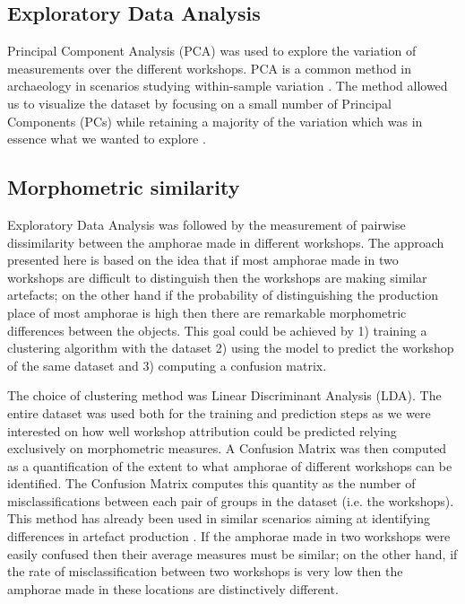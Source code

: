 \documentclass[review]{elsarticle}
\begin{document}
\subsection{Exploratory Data Analysis}


Principal Component Analysis (PCA) was used to explore the variation of measurements over the different workshops. PCA is a common method in archaeology in scenarios studying within-sample variation \citep{ shennan_quantifying_1997, li_crossbows_2014, schillinger_differences_2016}. The method allowed us to visualize the dataset by focusing on a small number of Principal Components (PCs) while retaining a majority of the variation which was in essence what we wanted to explore \citep{jolliffe_principal_2002}. 

\subsection{Morphometric similarity} 

Exploratory Data Analysis was followed by the measurement of pairwise dissimilarity between the amphorae made in different workshops. The approach presented here is based on the idea that if most amphorae made in two workshops are difficult to distinguish then the workshops are making similar artefacts; on the other hand if the probability of distinguishing the production place of most amphorae is high then there are remarkable morphometric differences between the objects. This goal could be achieved by 1) training a clustering algorithm with the dataset 2) using the model to predict the workshop of the same dataset and 3) computing a confusion matrix.

The choice of clustering method was Linear Discriminant Analysis (LDA). The entire dataset was used both for the training and prediction steps as we were interested on how well workshop attribution could be predicted relying exclusively on morphometric measures. A Confusion Matrix was then computed as a quantification of the extent to what amphorae of different workshops can be identified. The Confusion Matrix computes this quantity as the number of misclassifications between each pair of groups in the dataset (i.e. the workshops). This method has already been used in similar scenarios aiming at identifying differences in artefact production \citep{charlton_investigating_2012, thorpe_distribution_1984,i_martin_alisis_1998}. If the amphorae made in two workshops were easily confused then their average measures must be similar; on the other hand, if the rate of misclassification between two workshops is very low then the amphorae made in these locations are distinctively different.
\end{document}

